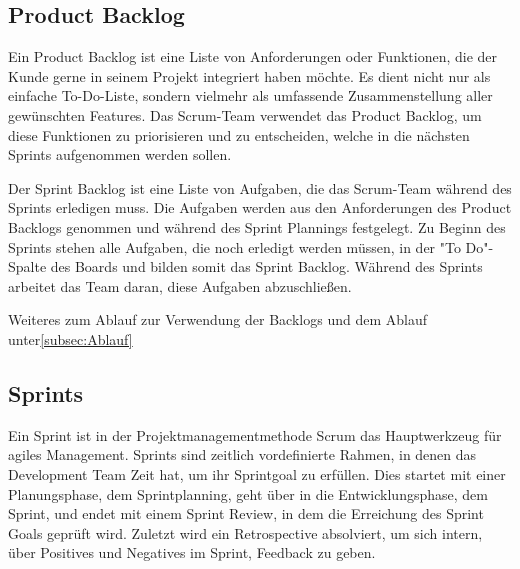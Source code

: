 \subsection{Product Backlog}\label{subsec:product-backlog}
%
Ein Product Backlog ist eine Liste von Anforderungen oder Funktionen, die der Kunde gerne in seinem Projekt integriert haben möchte.
Es dient nicht nur als einfache To-Do-Liste, sondern vielmehr als umfassende Zusammenstellung aller gewünschten Features.
Das Scrum-Team verwendet das Product Backlog, um diese Funktionen zu priorisieren und zu entscheiden, welche in die nächsten Sprints aufgenommen werden sollen.\cite[.vgl]{ProductBacklog}

Der Sprint Backlog ist eine Liste von Aufgaben, die das Scrum-Team während des Sprints erledigen muss.
Die Aufgaben werden aus den Anforderungen des Product Backlogs genommen und während des Sprint Plannings festgelegt.
Zu Beginn des Sprints stehen alle Aufgaben, die noch erledigt werden müssen, in der "To Do"-Spalte des Boards und bilden somit das Sprint Backlog.
Während des Sprints arbeitet das Team daran, diese Aufgaben abzuschließen.\cite{SprintBacklog}

Weiteres zum Ablauf zur Verwendung der Backlogs und dem Ablauf unter\ref{subsec:Ablauf}

%

\subsection{Sprints}\label{subsec:sprints}
%
Ein Sprint ist in der Projektmanagementmethode Scrum das Hauptwerkzeug für agiles Management. Sprints sind zeitlich vordefinierte Rahmen, in denen das Development Team Zeit hat, um ihr Sprintgoal zu erfüllen.
Dies startet mit einer Planungsphase, dem Sprintplanning, geht über in die Entwicklungsphase, dem Sprint, und endet mit einem Sprint Review, in dem die Erreichung des Sprint Goals geprüft wird.
Zuletzt wird ein Retrospective absolviert, um sich intern, über Positives und Negatives im Sprint, Feedback zu geben.
%
